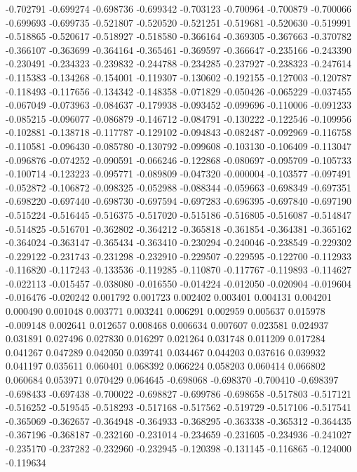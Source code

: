 -0.702791
-0.699274
-0.698736
-0.699342
-0.703123
-0.700964
-0.700879
-0.700066
-0.699693
-0.699735
-0.521807
-0.520520
-0.521251
-0.519681
-0.520630
-0.519991
-0.518865
-0.520617
-0.518927
-0.518580
-0.366164
-0.369305
-0.367663
-0.370782
-0.366107
-0.363699
-0.364164
-0.365461
-0.369597
-0.366647
-0.235166
-0.243390
-0.230491
-0.234323
-0.239832
-0.244788
-0.234285
-0.237927
-0.238323
-0.247614
-0.115383
-0.134268
-0.154001
-0.119307
-0.130602
-0.192155
-0.127003
-0.120787
-0.118493
-0.117656
-0.134342
-0.148358
-0.071829
-0.050426
-0.065229
-0.037455
-0.067049
-0.073963
-0.084637
-0.179938
-0.093452
-0.099696
-0.110006
-0.091233
-0.085215
-0.096077
-0.086879
-0.146712
-0.084791
-0.130222
-0.122546
-0.109956
-0.102881
-0.138718
-0.117787
-0.129102
-0.094843
-0.082487
-0.092969
-0.116758
-0.110581
-0.096430
-0.085780
-0.130792
-0.099608
-0.103130
-0.106409
-0.113047
-0.096876
-0.074252
-0.090591
-0.066246
-0.122868
-0.080697
-0.095709
-0.105733
-0.100714
-0.123223
-0.095771
-0.089809
-0.047320
-0.000004
-0.103577
-0.097491
-0.052872
-0.106872
-0.098325
-0.052988
-0.088344
-0.059663
-0.698349
-0.697351
-0.698220
-0.697440
-0.698730
-0.697594
-0.697283
-0.696395
-0.697840
-0.697190
-0.515224
-0.516445
-0.516375
-0.517020
-0.515186
-0.516805
-0.516087
-0.514847
-0.514825
-0.516701
-0.362802
-0.364212
-0.365818
-0.361854
-0.364381
-0.365162
-0.364024
-0.363147
-0.365434
-0.363410
-0.230294
-0.240046
-0.238549
-0.229302
-0.229122
-0.231743
-0.231298
-0.232910
-0.229507
-0.229595
-0.122700
-0.112933
-0.116820
-0.117243
-0.133536
-0.119285
-0.110870
-0.117767
-0.119893
-0.114627
-0.022113
-0.015457
-0.038080
-0.016550
-0.014224
-0.012050
-0.020904
-0.019604
-0.016476
-0.020242
0.001792
0.001723
0.002402
0.003401
0.004131
0.004201
0.000490
0.001048
0.003771
0.003241
0.006291
0.002959
0.005637
0.015978
-0.009148
0.002641
0.012657
0.008468
0.006634
0.007607
0.023581
0.024937
0.031891
0.027496
0.027830
0.016297
0.021264
0.031748
0.011209
0.017284
0.041267
0.047289
0.042050
0.039741
0.034467
0.044203
0.037616
0.039932
0.041197
0.035611
0.060401
0.068392
0.066224
0.058203
0.060414
0.066802
0.060684
0.053971
0.070429
0.064645
-0.698068
-0.698370
-0.700410
-0.698397
-0.698433
-0.697438
-0.700022
-0.698827
-0.699786
-0.698658
-0.517803
-0.517121
-0.516252
-0.519545
-0.518293
-0.517168
-0.517562
-0.519729
-0.517106
-0.517541
-0.365069
-0.362657
-0.364948
-0.364933
-0.368295
-0.363338
-0.365312
-0.364435
-0.367196
-0.368187
-0.232160
-0.231014
-0.234659
-0.231605
-0.234936
-0.241027
-0.235170
-0.237282
-0.232960
-0.232945
-0.120398
-0.131145
-0.116865
-0.124000
-0.119634

